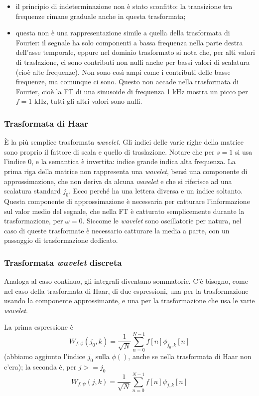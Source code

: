\documentclass[a4paper,11pt]{article}
\begin{document}
\begin{itemize}
    \item il principio di indeterminazione non è stato sconfitto: la transizione tra frequenze rimane graduale anche in questa trasformata;
    \item questa non è una rappresentazione simile a quella della trasformata di Fourier: il segnale ha solo componenti a bassa frequenza nella parte destra dell'asse temporale, eppure nel dominio
    trasformato si nota che, per alti valori di traslazione, ci sono contributi non nulli anche per bassi valori di scalatura (cioè alte frequenze). Non sono così ampi come i contributi delle basse frequenze,
    ma comunque ci sono. Questo non accade nella trasformata di Fourier, cioè la FT di una sinusoide di frequenza 1 kHz mostra un picco per $f = 1$ kHz, tutti gli altri valori sono nulli.
\end{itemize}

\subsubsection{Trasformata di Haar}
È la più semplice trasformata \textit{wavelet}. Gli indici delle varie righe della matrice sono proprio il fattore di scala e quello di traslazione. Notare che per $s=1$
si usa l'indice 0, e la semantica è invertita: indice grande indica alta frequenza. La prima riga della matrice non rappresenta una \textit{wavelet}, bensì una componente di approssimazione,
che non deriva da alcuna \textit{wavelet} e che si riferisce ad una scalatura standard $j_0$. Ecco perché ha una lettera diversa e un indice soltanto.
Questa componente di approssimazione è necessaria per catturare l'informazione sul valor medio del segnale, che nella FT è catturato semplicemente durante la trasformazione, per $\omega = 0$.
Siccome le \textit{wavelet} sono oscillatorie per natura, nel caso di queste trasformate è necessario catturare la media a parte, con un passaggio di trasformazione dedicato.

\subsubsection{Trasformata \textit{wavelet} discreta}
Analoga al caso continuo, gli integrali diventano sommatorie. C'è bisogno, come nel caso della trasformata di Haar, di due espressioni, una per la trasformazione usando
la componente approssimante, e una per la trasformazione che usa le varie \textit{wavelet}.
\par
La prima espressione è
\[
W_{f,\phi}(j_0, k) = \frac{1}{\sqrt{N}}\sum_{n=0}^{N-1}f[n]\phi_{j_0, k}[n]
\]
(abbiamo aggiunto l'indice $j_0$ sulla $\phi()$, anche se nella trasformata di Haar non c'era);
la seconda è, per $j>=j_0$
\[
W_{f,\psi}(j, k) = \frac{1}{\sqrt{N}}\sum_{n=0}^{N-1}f[n]\psi_{j, k}[n]
\]
\end{document}

